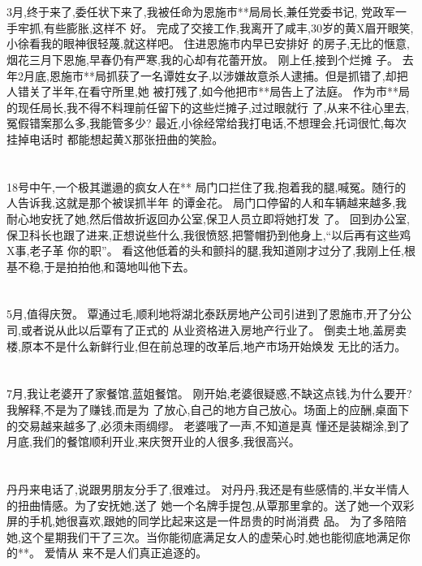 \documentclass[11pt]{article}
\begin{document}
\section{}
3月,终于来了,委任状下来了,我被任命为恩施市**局局长,兼任党委书记, 党政军一手牢抓,有些膨胀,这样不
好。 完成了交接工作,我离开了咸丰,30岁的黄X眉开眼笑,小徐看我的眼神很轻蔑,就这样吧。 住进恩施市内早已安排好
的房子,无比的惬意,烟花三月下恩施,早春仍有严寒,我的心却有花蕾开放。 刚上任,接到个烂摊
子。 去年2月底,恩施市**局抓获了一名谭姓女子,以涉嫌故意杀人逮捕。但是抓错了,却把人错关了半年,在看守所里,她
被打残了,如今他把市**局告上了法庭。 作为市**局的现任局长,我不得不料理前任留下的这些烂摊子,过过眼就行
了,从来不往心里去,冤假错案那么多,我能管多少? 最近,小徐经常给我打电话,不想理会,托词很忙,每次挂掉电话时
都能想起黄X那张扭曲的笑脸。

\section{}
18号中午,一个极其邋遢的疯女人在** 局门口拦住了我,抱着我的腿,喊冤。随行的人告诉我,这就是那个被误抓半年
的谭金花。 局门口停留的人和车辆越来越多,我耐心地安抚了她,然后借故折返回办公室,保卫人员立即将她打发
了。 回到办公室,保卫科长也跟了进来,正想说些什么,我很愤怒,把警帽扔到他身上,``以后再有这些鸡X事,老子革
你的职''。 看这他低着的头和颤抖的腿,我知道刚才过分了,我刚上任,根基不稳,于是拍拍他,和蔼地叫他下去。

\section{}
5月,值得庆贺。 覃通过毛,顺利地将湖北泰跃房地产公司引进到了恩施市,开了分公司,或者说从此以后覃有了正式的
从业资格进入房地产行业了。 倒卖土地,盖房卖楼,原本不是什么新鲜行业,但在前总理的改革后,地产市场开始焕发
无比的活力。

\section{}
7月,我让老婆开了家餐馆,蓝姐餐馆。 刚开始,老婆很疑惑,不缺这点钱,为什么要开? 我解释,不是为了赚钱,而是为
了放心,自己的地方自己放心。场面上的应酬,桌面下的交易越来越多了,必须未雨绸缪。 老婆哦了一声,不知道是真
懂还是装糊涂,到了月底,我们的餐馆顺利开业,来庆贺开业的人很多,我很高兴。

\section{}
丹丹来电话了,说跟男朋友分手了,很难过。 对丹丹,我还是有些感情的,半女半情人的扭曲情感。为了安抚她,送了
她一个名牌手提包,从覃那里拿的。送了她一个双彩屏的手机,她很喜欢,跟她的同学比起来这是一件昂贵的时尚消费
品。 为了多陪陪她,这个星期我们干了三次。当你能彻底满足女人的虚荣心时,她也能彻底地满足你的**。 爱情从
来不是人们真正追逐的。
\end{document}
